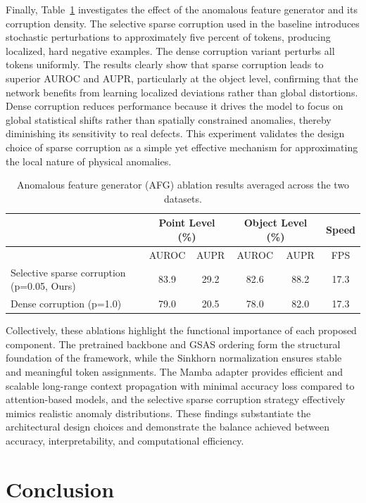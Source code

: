 Finally, Table~\ref{tab:afg_ablation} investigates the effect of the anomalous feature generator and its corruption density. The selective sparse corruption used in the baseline introduces stochastic perturbations to approximately five percent of tokens, producing localized, hard negative examples. The dense corruption variant perturbs all tokens uniformly. The results clearly show that sparse corruption leads to superior AUROC and AUPR, particularly at the object level, confirming that the network benefits from learning localized deviations rather than global distortions. Dense corruption reduces performance because it drives the model to focus on global statistical shifts rather than spatially constrained anomalies, thereby diminishing its sensitivity to real defects. This experiment validates the design choice of sparse corruption as a simple yet effective mechanism for approximating the local nature of physical anomalies.

\begin{table}[ht]
\centering
\caption{Anomalous feature generator (AFG) ablation results averaged across the two datasets.}
\label{tab:afg_ablation}
\begin{tabular}{l|cc|cc|c}
\hline
& \multicolumn{2}{c|}{Point Level (\%)} & \multicolumn{2}{c|}{Object Level (\%)} & Speed \\
\hline
& AUROC & AUPR & AUROC & AUPR & FPS \\  
\hline
Selective sparse corruption (p=0.05, Ours) & 83.9 & 29.2 & 82.6 & 88.2 & 17.3 \\
Dense corruption (p=1.0) & 79.0 & 20.5 & 78.0 & 82.0 & 17.3 \\
\hline
\end{tabular}
\end{table}

Collectively, these ablations highlight the functional importance of each proposed component. The pretrained backbone and GSAS ordering form the structural foundation of the framework, while the Sinkhorn normalization ensures stable and meaningful token assignments. The Mamba adapter provides efficient and scalable long-range context propagation with minimal accuracy loss compared to attention-based models, and the selective sparse corruption strategy effectively mimics realistic anomaly distributions. These findings substantiate the architectural design choices and demonstrate the balance achieved between accuracy, interpretability, and computational efficiency.

\section{Conclusion}

